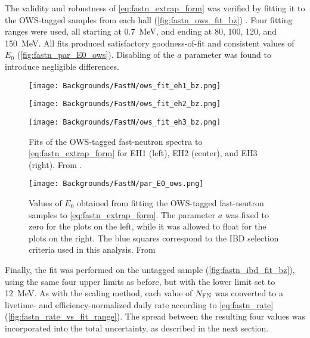 \documentclass[../thesis.tex]{subfiles}
\begin{document}
The validity and robustness of \autoref{eq:fastn_extrap_form} was verified by fitting it to the OWS-tagged samples from each hall (\autoref{fig:fastn_ows_fit_bz}) \cite{fastn}. Four fitting ranges were used, all starting at 0.7~MeV, and ending at 80, 100, 120, and 150~MeV. All fits produced satisfactory goodness-of-fit and consistent values of $E_0$ (\autoref{fig:fastn_par_E0_ows}). Disabling of the $a$ parameter was found to introduce negligible differences.

\begin{figure}[ht]
  \begin{minipage}{0.333\textwidth}%
    \texttt{[image: Backgrounds/FastN/ows\_fit\_eh1\_bz.png]}%
  \end{minipage}%
  \begin{minipage}{0.333\textwidth}%
    \texttt{[image: Backgrounds/FastN/ows\_fit\_eh2\_bz.png]}%
  \end{minipage}%
  \begin{minipage}{0.333\textwidth}%
    \texttt{[image: Backgrounds/FastN/ows\_fit\_eh3\_bz.png]}%
  \end{minipage}%
  \caption{Fits of the OWS-tagged fast-neutron spectra to \autoref{eq:fastn_extrap_form} for EH1 (left), EH2 (center), and EH3 (right). From \cite{fastn}.}
  \label{fig:fastn_ows_fit_bz}
\end{figure}

\begin{figure}[ht]
  \texttt{[image: Backgrounds/FastN/par\_E0\_ows.png]}
  \caption{Values of $E_0$ obtained from fitting the OWS-tagged fast-neutron samples to \autoref{eq:fastn_extrap_form}. The parameter $a$ was fixed to zero for the plots on the left, while it was allowed to float for the plots on the right. The blue squares correspond to the IBD selection criteria used in this analysis. From \cite{fastn}}
  \label{fig:fastn_par_E0_ows}
\end{figure}

Finally, the fit was performed on the untagged sample (\autoref{fig:fastn_ibd_fit_bz}), using the same four upper limits as before, but with the lower limit set to 12~MeV.  As with the scaling method, each value of $N_\mathrm{FN}$ was converted to a livetime- and efficiency-normalized daily rate according to \autoref{eq:fastn_rate} (\autoref{fig:fastn_rate_vs_fit_range}). The spread between the resulting four values was incorporated into the total uncertainty, as described in the next section.
\end{document}
